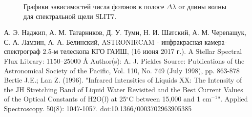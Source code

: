 \documentclass[a4paper]{article}
\begin{document}
\begin{figure}[h]
\begin{minipage}[h]{0.5\linewidth}
\end{minipage}
\begin{minipage}[h]{0.5\linewidth}
\end{minipage}
\begin{minipage}[h]{0.5\linewidth}
\end{minipage}
\caption{Графики зависимостей числа фотонов в полосе $\Delta\lambda$ от длины волны для спектральной щели SLIT7.}
\end{figure}
\clearpage



\hfill\break

\begin{thebibliography}{3}
А. Э. Наджип, А. М. Татарников, Д. У. Туми, Н. И. Шатский, А. М. Черепащук, С. А. Ламзин, А. А. Белинский,  ASTRONIRCAM - инфракрасная камера-спектрограф 2.5-м телескопа КГО ГАИШ, (16 июня 2017 г.).
A Stellar Spectral Flux Library: 1150–25000 Å
Author(s): A. J.  Pickles
Source: 
Publications of the Astronomical Society of the Pacific, 
Vol. 110, No. 749 (July 1998),
pp. 863-878
Bertie J.E.; Lan Z. (1996). "Infrared Intensities of Liquids XX: The Intensity of the JH Stretching Band of Liquid Water Revisited and the Best Current Values of the Optical Constants of H2O(l) at 25$^\circ$C between 15,000 and 1 cm$^{-1}$". Applied Spectroscopy. 50(8): 1047-1057.
doi:10.1366/0003702963905385
\end{thebibliography}
\end{document}

